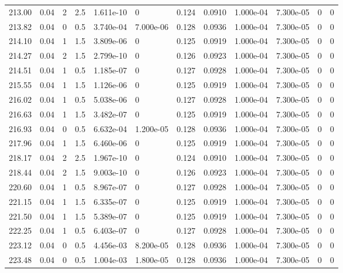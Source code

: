\documentclass[preview]{standalone}
\begin{document}
{{{{{{{\begin{tabular}{L{1.2cm}C{1.2cm} C{0.3cm}C{0.5cm} C{1.4cm}C{1.4cm} C{1.4cm}C{1.4cm} C{1.6cm}C{1.6cm} C{1.6cm}C{1.6cm}}
  213.00  &  0.04  & 2     & 2.5 &  1.611e-10  & 0  &  0.124&   0.0910& 1.000e-04 & 7.300e-05   &  0 & 0  \\ 
  213.82  &  0.04  & 0     & 0.5 &  3.740e-04  & 7.000e-06  &  0.128&   0.0936& 1.000e-04 & 7.300e-05   &  0 & 0  \\ 
  214.10  &  0.04  & 1     & 1.5 &  3.809e-06  & 0  &  0.125&   0.0919& 1.000e-04 & 7.300e-05   &  0 & 0  \\ 
  214.27  &  0.04  & 2     & 1.5 &  2.799e-10  & 0  &  0.126&   0.0923& 1.000e-04 & 7.300e-05   &  0 & 0  \\ 
  214.51  &  0.04  & 1     & 0.5 &  1.185e-07  & 0  &  0.127&   0.0928& 1.000e-04 & 7.300e-05   &  0 & 0  \\ 
  215.55  &  0.04  & 1     & 1.5 &  1.126e-06  & 0  &  0.125&   0.0919& 1.000e-04 & 7.300e-05   &  0 & 0  \\ 
  216.02  &  0.04  & 1     & 0.5 &  5.038e-06  & 0  &  0.127&   0.0928& 1.000e-04 & 7.300e-05   &  0 & 0  \\ 
  216.63  &  0.04  & 1     & 1.5 &  3.482e-07  & 0  &  0.125&   0.0919& 1.000e-04 & 7.300e-05   &  0 & 0  \\ 
  216.93  &  0.04  & 0     & 0.5 &  6.632e-04  & 1.200e-05  &  0.128&   0.0936& 1.000e-04 & 7.300e-05   &  0 & 0  \\ 
  217.96  &  0.04  & 1     & 1.5 &  6.460e-06  & 0  &  0.125&   0.0919& 1.000e-04 & 7.300e-05   &  0 & 0  \\ 
  218.17  &  0.04  & 2     & 2.5 &  1.967e-10  & 0  &  0.124&   0.0910& 1.000e-04 & 7.300e-05   &  0 & 0  \\ 
  218.44  &  0.04  & 2     & 1.5 &  9.003e-10  & 0  &  0.126&   0.0923& 1.000e-04 & 7.300e-05   &  0 & 0  \\ 
  220.60  &  0.04  & 1     & 0.5 &  8.967e-07  & 0  &  0.127&   0.0928& 1.000e-04 & 7.300e-05   &  0 & 0  \\ 
  221.15  &  0.04  & 1     & 1.5 &  6.335e-07  & 0  &  0.125&   0.0919& 1.000e-04 & 7.300e-05   &  0 & 0  \\ 
  221.50  &  0.04  & 1     & 1.5 &  5.389e-07  & 0  &  0.125&   0.0919& 1.000e-04 & 7.300e-05   &  0 & 0  \\ 
  222.25  &  0.04  & 1     & 0.5 &  6.403e-07  & 0  &  0.127&   0.0928& 1.000e-04 & 7.300e-05   &  0 & 0  \\ 
  223.12  &  0.04  & 0     & 0.5 &  4.456e-03  & 8.200e-05  &  0.128&   0.0936& 1.000e-04 & 7.300e-05   &  0 & 0  \\ 
  223.48  &  0.04  & 0     & 0.5 &  1.004e-03  & 1.800e-05  &  0.128&   0.0936& 1.000e-04 & 7.300e-05   &  0 & 0  \\ 

\end{tabular}}}}}}}}
\end{document}
